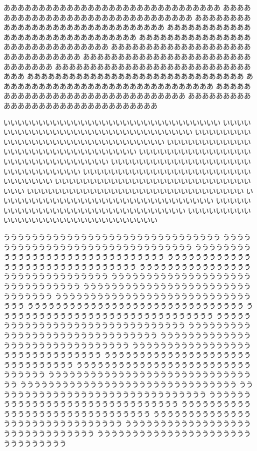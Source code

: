 \begin{breakDbox}[fboxsep=10pt]
%
あああああああああああああああああああああああああああああああ
あああああああああああああああああああああああああああああああ
あああああああああああああああああああああああああああああああ
あああああああああああああああああああああああああああああああ
あああああああああああああああああああああああああああああああ
あああああああああああああああああああああああああああああああ
あああああああああああああああああああああああああああああああ
あああああああああああああああああああああああああああああああ
あああああああああああああああああああああああああああああああ
あああああああああああああああああああああああああああああああ
あああああああああああああああああああああああああああああああ
あああああああああああああああああああああああああああああああ

いいいいいいいいいいいいいいいいいいいいいいいいいいいいいいい
いいいいいいいいいいいいいいいいいいいいいいいいいいいいいいい
いいいいいいいいいいいいいいいいいいいいいいいいいいいいいいい
いいいいいいいいいいいいいいいいいいいいいいいいいいいいいいい
いいいいいいいいいいいいいいいいいいいいいいいいいいいいいいい
いいいいいいいいいいいいいいいいいいいいいいいいいいいいいいい
いいいいいいいいいいいいいいいいいいいいいいいいいいいいいいい
いいいいいいいいいいいいいいいいいいいいいいいいいいいいいいい
いいいいいいいいいいいいいいいいいいいいいいいいいいいいいいい
いいいいいいいいいいいいいいいいいいいいいいいいいいいいいいい
いいいいいいいいいいいいいいいいいいいいいいいいいいいいいいい
いいいいいいいいいいいいいいいいいいいいいいいいいいいいいいい

ううううううううううううううううううううううううううううううう
ううううううううううううううううううううううううううううううう
ううううううううううううううううううううううううううううううう
ううううううううううううううううううううううううううううううう
ううううううううううううううううううううううううううううううう
ううううううううううううううううううううううううううううううう
ううううううううううううううううううううううううううううううう
ううううううううううううううううううううううううううううううう
ううううううううううううううううううううううううううううううう
ううううううううううううううううううううううううううううううう
ううううううううううううううううううううううううううううううう
ううううううううううううううううううううううううううううううう
ううううううううううううううううううううううううううううううう
ううううううううううううううううううううううううううううううう
ううううううううううううううううううううううううううううううう
ううううううううううううううううううううううううううううううう
ううううううううううううううううううううううううううううううう
ううううううううううううううううううううううううううううううう
ううううううううううううううううううううううううううううううう
ううううううううううううううううううううううううううううううう
ううううううううううううううううううううううううううううううう
ううううううううううううううううううううううううううううううう
ううううううううううううううううううううううううううううううう
ううううううううううううううううううううううううううううううう
\end{breakDbox}
